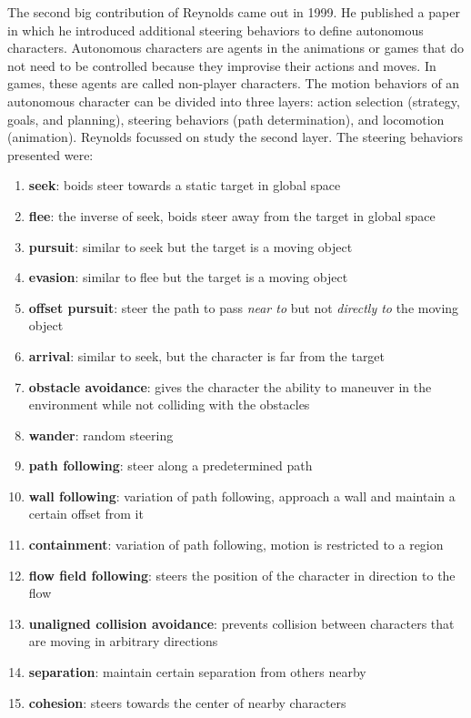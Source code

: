 The second big contribution of Reynolds came out in 1999. He published a paper in which he introduced additional steering behaviors to define autonomous characters\cite{craigSteeringBehaviors}. Autonomous characters are agents in the animations or games that do not need to be controlled because they improvise their actions and moves. In games, these agents are called non-player characters. The motion behaviors of an autonomous character can be divided into three layers: action selection (strategy, goals, and planning), steering behaviors (path determination), and locomotion (animation). Reynolds focussed on study the second layer. The steering behaviors presented were:
\begin{enumerate}
\item \textbf{seek}: boids steer towards a static target in global space
\item \textbf{flee}: the inverse of seek, boids steer away from the target in global space
\item \textbf{pursuit}: similar to seek but the target is a moving object
\item \textbf{evasion}: similar to flee but the target is a moving object
\item \textbf{offset pursuit}: steer the path to pass \textit{near to} but not \textit{directly to} the moving object
\item \textbf{arrival}: similar to seek, but the character is far from the target
\item \textbf{obstacle avoidance}: gives the character the ability to maneuver in the environment while not colliding with the obstacles 
\item \textbf{wander}: random steering
\item \textbf{path following}: steer along a predetermined path
\item \textbf{wall following}: variation of path following, approach a wall and maintain a certain offset from it
\item \textbf{containment}: variation of path following, motion is restricted to a region
\item \textbf{flow field following}: steers the position of the character in direction to the flow
\item \textbf{unaligned collision avoidance}: prevents collision between characters that are moving in arbitrary directions
\item \textbf{separation}: maintain certain separation from others nearby
\item \textbf{cohesion}: steers towards the center of nearby characters

\end{enumerate}
